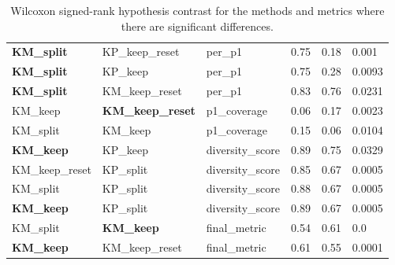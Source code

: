 \begin{table}[h!]
{\begin{tabular}{@{}llllll@{}}
\textbf{KM\_split} & KP\_keep\_reset          & per\_p1          & 0.75    & 0.18    & 0.001  \\
\textbf{KM\_split} & KP\_keep                 & per\_p1          & 0.75    & 0.28    & 0.0093 \\
\textbf{KM\_split} & KM\_keep\_reset          & per\_p1          & 0.83    & 0.76    & 0.0231 \\
KM\_keep           & \textbf{KM\_keep\_reset} & p1\_coverage     & 0.06    & 0.17    & 0.0023 \\
KM\_split          & KM\_keep                 & p1\_coverage     & 0.15    & 0.06    & 0.0104 \\
\textbf{KM\_keep}  & KP\_keep                 & diversity\_score & 0.89    & 0.75    & 0.0329 \\
KM\_keep\_reset    & KP\_split                & diversity\_score & 0.85    & 0.67    & 0.0005 \\
KM\_split          & KP\_split                & diversity\_score & 0.88    & 0.67    & 0.0005 \\
\textbf{KM\_keep}  & KP\_split                & diversity\_score & 0.89    & 0.67    & 0.0005 \\
KM\_split          & \textbf{KM\_keep}        & final\_metric    & 0.54    & 0.61    & 0.0    \\
\textbf{KM\_keep}  & KM\_keep\_reset          & final\_metric    & 0.61    & 0.55    & 0.0001 \\
\bottomrule
\end{tabular}%
}
\caption{Wilcoxon signed-rank hypothesis contrast for the methods and metrics where there are significant differences.}
\label{table:annex-rule-extraction-xai-metrics-h2}
\end{table}


